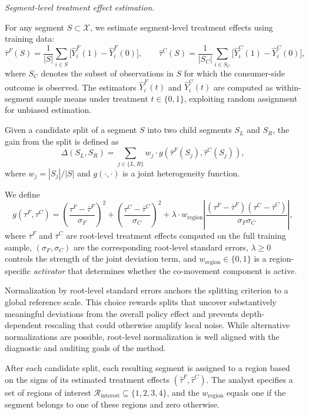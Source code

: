 \documentclass[11pt,letterpaper,english]{article}
\theoremstyle{definition}
\theoremstyle{definition}
\begin{document}
\begin{bibunit}
\vspace{5mm}
\noindent
\emph{Segment-level treatment effect estimation.}

For any segment $S \subset \mathcal{X}$, we estimate segment-level treatment effects using training data:
\[
\hat{\tau}^F(S) = \frac{1}{|S|} \sum_{i \in S} \big[ \hat{Y}^F_i(1) - \hat{Y}^F_i(0) \big], \qquad
\hat{\tau}^C(S) = \frac{1}{|S_C|} \sum_{i \in S_C} \big[ \hat{Y}^C_i(1) - \hat{Y}^C_i(0) \big],
\]
where $S_C$ denotes the subset of observations in $S$ for which the consumer-side outcome is observed. The estimators $\hat{Y}^F_i(t)$ and $\hat{Y}^C_i(t)$ are computed as within-segment sample means under treatment $t \in \{0,1\}$, exploiting random assignment for unbiased estimation.

Given a candidate split of a segment $S$ into two child segments $S_L$ and $S_R$, the gain from the split is defined as
\[
\Delta(S_L,S_R)
=
\sum_{j \in \{L,R\}} w_j \cdot g\!\left( \hat{\tau}^F(S_j), \hat{\tau}^C(S_j) \right),
\]
where $w_j = |S_j|/|S|$ and $g(\cdot,\cdot)$ is a joint heterogeneity function.

We define
\[
g(\tau^F,\tau^C)
=
\left( \frac{\tau^F - \bar{\tau}^F}{\sigma_F} \right)^2
+
\left( \frac{\tau^C - \bar{\tau}^C}{\sigma_C} \right)^2
+
\lambda \cdot w_{\text{region}}
\left|
\frac{(\tau^F - \bar{\tau}^F)(\tau^C - \bar{\tau}^C)}{\sigma_F \sigma_C}
\right|,
\]
where $\bar{\tau}^F$ and $\bar{\tau}^C$ are root-level treatment effects computed on the full training sample, $(\sigma_F,\sigma_C)$ are the corresponding root-level standard errors, $\lambda \ge 0$ controls the strength of the joint deviation term, and $w_{\text{region}} \in \{0,1\}$ is a region-specific \emph{activator} that determines whether the co-movement component is active.


Normalization by root-level standard errors anchors the splitting criterion to a global reference scale. This choice rewards splits that uncover substantively meaningful deviations from the overall policy effect and prevents depth-dependent rescaling that could otherwise amplify local noise. While alternative normalizations are possible, root-level normalization is well aligned with the diagnostic and auditing goals of the method.

After each candidate split, each resulting segment is assigned to a region based on the signs of its estimated treatment effects $(\hat{\tau}^F,\hat{\tau}^C)$. The analyst specifies a set of regions of interest $\mathcal{R}_{\text{interest}} \subseteq \{1,2,3,4\}$, and the $w_{\text{region}}$ equals one if the segment belongs to one of these regions and zero otherwise.


\end{bibunit}
\end{document}
